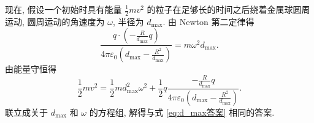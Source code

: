 \documentclass{article}
\begin{document}
现在, 假设一个初始时具有能量 $\frac12mv^2$ 的粒子在足够长的时间之后绕着金属球圆周运动,
圆周运动的角速度为 $\omega$, 半径为 $d_{\mathrm{max}}$.
由 Newton 第二定律得
\begin{equation}
	\frac{q\cdot\left(-\frac R{d_{\mathrm{max}}}q\right)}
	{4\pi\varepsilon_0\left(d_{\mathrm{max}}-\frac{R^2}{d_{\mathrm{max}}}\right)}
	=m\omega^2d_{\mathrm{max}}.
\end{equation}
由能量守恒得
\begin{equation}
	\frac12mv^2=\frac12md_{\mathrm{max}}^2\omega^2+\frac12q
	\frac{-\frac R{d_{\mathrm{max}}}q}
	{4\pi\varepsilon_0\left(d_{\mathrm{max}}-\frac{R^2}{d_{\mathrm{max}}}\right)}.
\end{equation}
联立成关于 $d_{\mathrm{max}}$ 和 $\omega$ 的方程组,
解得与式 \ref{eq:d_max答案} 相同的答案.
\end{document}
